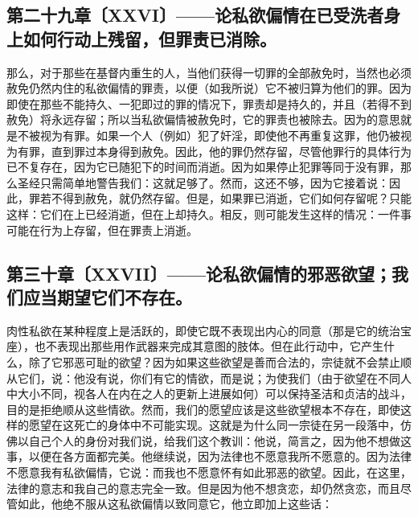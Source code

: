 
\subsection{第二十九章〔XXVI〕——论私欲偏情在已受洗者身上如何行动上残留，但罪责已消除。}

那么，对于那些在基督内重生的人，当他们获得一切罪的全部赦免时，当然也必须赦免仍然内住的私欲偏情的罪责，以便（如我所说）它不被归算为他们的罪。因为即使在那些不能持久、一犯即过的罪的情况下，罪责却是持久的，并且（若得不到赦免）将永远存留；所以当私欲偏情被赦免时，它的罪责也被除去。因为的意思就是不被视为有罪。如果一个人（例如）犯了奸淫，即使他不再重复这罪，他仍被视为有罪，直到罪过本身得到赦免。因此，他的罪仍然存留，尽管他罪行的具体行为已不复存在，因为它已随犯下的时间而消逝。因为如果停止犯罪等同于没有罪，那么圣经只需简单地警告我们：这就足够了。然而，这还不够，因为它接着说：因此，罪若不得到赦免，就仍然存留。但是，如果罪已消逝，它们如何存留呢？只能这样：它们在上已经消逝，但在上却持久。相反，则可能发生这样的情况：一件事可能在行为上存留，但在罪责上消逝。\par


\subsection{第三十章〔XXVII〕——论私欲偏情的邪恶欲望；我们应当期望它们不存在。}

肉性私欲在某种程度上是活跃的，即使它既不表现出内心的同意（那是它的统治宝座），也不表现出那些用作武器来完成其意图的肢体。但在此行动中，它产生什么，除了它邪恶可耻的欲望？因为如果这些欲望是善而合法的，宗徒就不会禁止顺从它们，说：他没有说，你们有它的情欲，而是说；为使我们（由于欲望在不同人中大小不同，视各人在内在之人的更新上进展如何）可以保持圣洁和贞洁的战斗，目的是拒绝顺从这些情欲。然而，我们的愿望应该是这些欲望根本不存在，即使这样的愿望在这死亡的身体中不可能实现。这就是为什么同一宗徒在另一段落中，仿佛以自己个人的身份对我们说，给我们这个教训：他说，简言之，因为他不想做这事，以便在各方面都完美。他继续说，因为法律也不愿意我所不愿意的。因为法律不愿意我有私欲偏情，它说：而我也不愿意怀有如此邪恶的欲望。因此，在这里，法律的意志和我自己的意志完全一致。但是因为他不想贪恋，却仍然贪恋，而且尽管如此，他绝不服从这私欲偏情以致同意它，他立即加上这些话：\par

